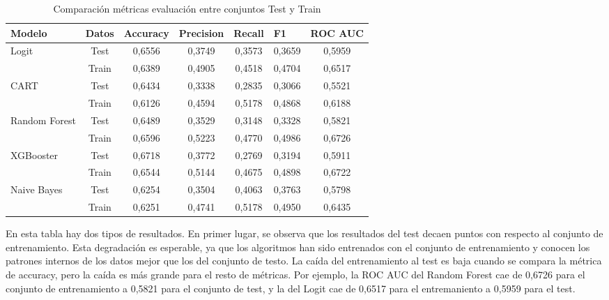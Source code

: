 \begin{table}[ht]
\centering
\begin{tabular}{lcccccc}
\hline
\textbf{Modelo} & \multicolumn{1}{l}{\textbf{Datos}} & \multicolumn{1}{l}{\textbf{Accuracy}} & \multicolumn{1}{l}{\textbf{Precision}} & \multicolumn{1}{l}{\textbf{Recall}} & \multicolumn{1}{l}{\textbf{F1}} & \multicolumn{1}{l}{\textbf{ROC AUC}} \\ \hline
\multirow{2}{*}{Logit} & Test & 0,6556 & 0,3749 & 0,3573 & 0,3659 & 0,5959 \\
 & Train & 0,6389 & 0,4905 & 0,4518 & 0,4704 & 0,6517 \\ \hline
\multirow{2}{*}{CART} & Test & 0,6434 & 0,3338 & 0,2835 & 0,3066 & 0,5521 \\
 & Train & 0,6126 & 0,4594 & 0,5178 & 0,4868 & 0,6188 \\ \hline
\multirow{2}{*}{Random Forest} & Test & 0,6489 & 0,3529 & 0,3148 & 0,3328 & 0,5821 \\
 & Train & 0,6596 & 0,5223 & 0,4770 & 0,4986 & 0,6726 \\ \hline
\multirow{2}{*}{XGBooster} & Test & 0,6718 & 0,3772 & 0,2769 & 0,3194 & 0,5911 \\
 & Train & 0,6544 & 0,5144 & 0,4675 & 0,4898 & 0,6722 \\ \hline
\multirow{2}{*}{Naive Bayes} & Test & 0,6254 & 0,3504 & 0,4063 & 0,3763 & 0,5798 \\
 & Train & 0,6251 & 0,4741 & 0,5178 & 0,4950 & 0,6435 \\ \hline
\end{tabular}
\caption{Comparación métricas evaluación entre conjuntos Test y Train}
\label{table:train}
\end{table}

En esta tabla hay dos tipos de resultados. En primer lugar, se observa que los resultados del test decaen puntos con respecto al conjunto de entrenamiento. Esta degradación es esperable, ya que los algoritmos han sido entrenados con el conjunto de entrenamiento y conocen los patrones internos de los datos mejor que los del conjunto de testo. La caída del entrenamiento al test es baja cuando se compara la métrica de accuracy, pero la caída es más grande para el resto de métricas. Por ejemplo, la ROC AUC del Random Forest cae de 0,6726 para el conjunto de entrenamiento a 0,5821 para el conjunto de test, y la del Logit cae de 0,6517 para el entremaniento a 0,5959 para el test.

